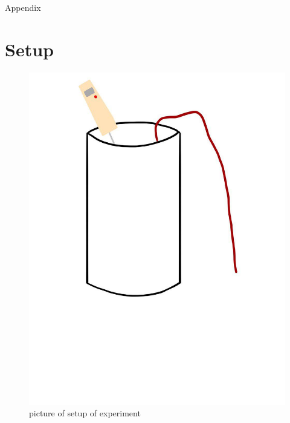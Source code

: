 \documentclass[10pt]{article}
\begin{document}
\begin{appendices}
\huge
Appendix
\normalsize
\section{Setup}
\begin{figure}[h]
\caption{picture of setup of experiment}
\centering
\includegraphics[scale=0.3]{3}
\end{figure}
\newpage

\end{appendices}
\end{document}
